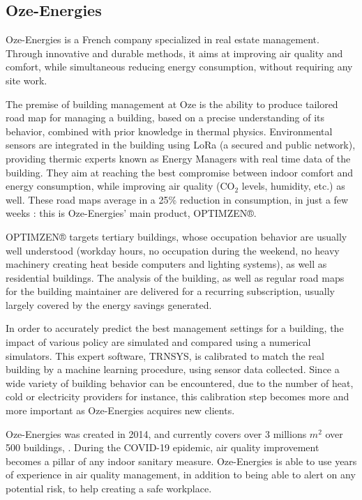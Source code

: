 \documentclass[12pt]{article}
\begin{document}
\subsection{Oze-Energies}

Oze-Energies is a French company specialized in real estate management. Through innovative and durable methods, it aims at improving air quality and comfort, while simultaneous reducing energy consumption, without requiring any site work.

The premise of building management at Oze is the ability to produce tailored road map for managing a building, based on a precise understanding of its behavior, combined with prior knowledge in thermal physics. Environmental sensors are integrated in the building using LoRa (a secured and public network), providing thermic experts known as Energy Managers with real time data of the building. They aim at reaching the best compromise between indoor comfort and energy consumption, while improving air quality (\ensuremath{\mathrm{CO_2}} levels, humidity, etc.) as well. These road maps average in a 25\% reduction in consumption, in just a few weeks : this is Oze-Energies' main product, OPTIMZEN®.

OPTIMZEN® targets tertiary buildings, whose occupation behavior are usually well understood (workday hours, no occupation during the weekend, no heavy machinery creating heat beside computers and lighting systems), as well as residential buildings. The analysis of the building, as well as regular road maps for the building maintainer are delivered for a recurring subscription, usually largely covered by the energy savings generated.

In order to accurately predict the best management settings for a building, the impact of various policy are simulated and compared using a numerical simulators. This expert software, TRNSYS, is calibrated to match the real building by a machine learning procedure, using sensor data collected. Since a wide variety of building behavior can be encountered, due to the number of heat, cold or electricity providers for instance, this calibration step becomes more and more important as Oze-Energies acquires new clients.

Oze-Energies was created in 2014, and currently covers over 3 millions $m^2$ over 500 buildings, \cite{}. During the COVID-19 epidemic, air quality improvement becomes a pillar of any indoor sanitary measure. Oze-Energies is able to use years of experience in air quality management, in addition to being able to alert on any potential risk, to help creating a safe workplace.
\end{document}
